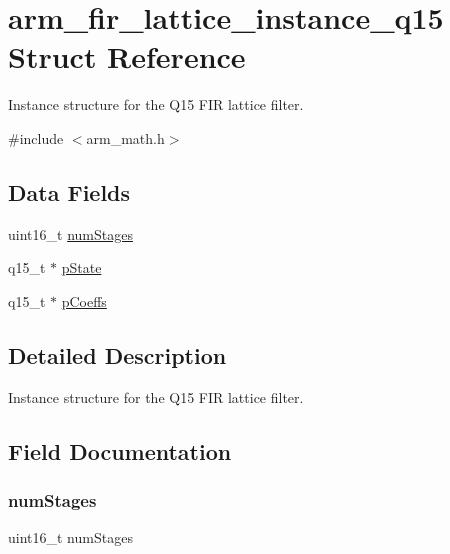 \hypertarget{structarm__fir__lattice__instance__q15}{}\section{arm\+\_\+fir\+\_\+lattice\+\_\+instance\+\_\+q15 Struct Reference}
\label{structarm__fir__lattice__instance__q15}


Instance structure for the Q15 F\+IR lattice filter.  




{\ttfamily \#include $<$arm\+\_\+math.\+h$>$}

\subsection*{Data Fields}
\begin{DoxyCompactItemize}
\item 
uint16\+\_\+t \hyperlink{structarm__fir__lattice__instance__q15_a4cceb90547b3e585d4c7aabaa8057212}{num\+Stages}
\item 
q15\+\_\+t $\ast$ \hyperlink{structarm__fir__lattice__instance__q15_ae29dfdb736374fcddaeaec4b7770170c}{p\+State}
\item 
q15\+\_\+t $\ast$ \hyperlink{structarm__fir__lattice__instance__q15_a7ca181a37f714d174445f486bebce26f}{p\+Coeffs}
\end{DoxyCompactItemize}


\subsection{Detailed Description}
Instance structure for the Q15 F\+IR lattice filter. 

\subsection{Field Documentation}
\mbox{\label{structarm__fir__lattice__instance__q15_a4cceb90547b3e585d4c7aabaa8057212}} 
\subsubsection{\texorpdfstring{num\+Stages}{numStages}}
{\footnotesize\ttfamily uint16\+\_\+t num\+Stages}

